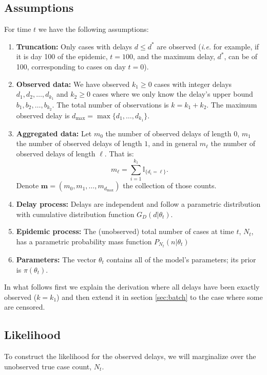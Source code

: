 \documentclass{article}
\begin{document}
\subsection{Assumptions}
For time $t$ we have the following assumptions:
\begin{enumerate}
    \item \textbf{Truncation:} Only cases with delays $d \leq d^*$ are observed (\textit{i.e.} for example, if it is day 100 of the epidemic, $t = 100$, and the maximum delay, $d^*$, can be of 100, corresponding to cases on day $t = 0$).
    \item \textbf{Observed data:} We have observed $k_1 \geq 0$ cases with integer delays $d_1, d_2, \dots, d_{k_1}$ and $k_2 \geq 0$ cases where we only know the delay's upper bound $b_1, b_2, \dots, b_{k_2}$. The total number of observations is $k = k_1 + k_2$. The maximum observed delay is $d_{\max} = \max \{ d_1, \dots, d_{k_1}\}$.
    \item \textbf{Aggregated data:} Let $m_0$ the number of observed delays of length $0$, $m_1$ the number of observed delays of length $1$, and in general $m_\ell$ the number of observed delays of length $\ell$. That is:
    \begin{equation}
    	m_{\ell} = \sum\limits_{i = 1}^{k_1} \mathbb{I}_{\{d_i = \ell\}}.
    \end{equation}
    Denote $\mathbf{m} = (m_0, m_1, \dots, m_{d_{\max}})$ the collection of those counts. 
	\item \textbf{Delay process:} Delays are independent and follow a parametric distribution with cumulative distribution function $G_D(d|\theta_t)$.   
    \item \textbf{Epidemic process:} The (unobserved) total number of cases at time $t$, $N_t$, has a parametric probability mass function $P_{N_t}(n|\theta_t)$
    \item \textbf{Parameters:} The vector $\theta_t$ contains all of the model's parameters; its prior is $\pi(\theta_t)$. 
\end{enumerate}

In what follows first we explain the derivation where all delays have been exactly observed ($k = k_1$) and then extend it in section \ref{sec:batch} to the case where some are censored. 

\subsection{Likelihood}
To construct the likelihood for the observed delays, we will marginalize over the unobserved true case count, $N_t$. 
\end{document}
